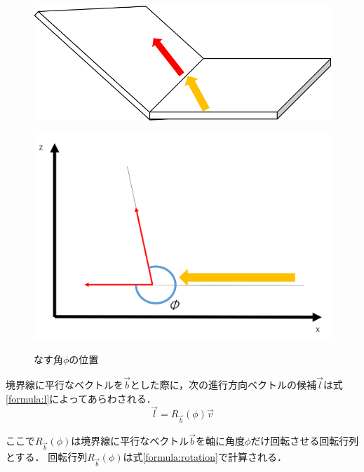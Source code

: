 \documentclass[a4paper,11pt]{jarticle}
\begin{document}
	\begin{figure}
		\begin{minipage}{0.5\linewidth}
			\centering
			\includegraphics[width=1\linewidth]{png/sub.png}
			\label{fig:phi}
		\end{minipage}
		\begin{minipage}{0.5\linewidth}
			\centering
			\includegraphics[width=1\linewidth]{png/rotation.png}
			\label{fig:xz}
		\end{minipage}
		\caption{なす角$\phi$の位置}
		\label{fig:rotation}
	\end{figure}
	
	境界線に平行なベクトルを$\vec{b} $とした際に，次の進行方向ベクトルの候補$\vec{l}$は式\ref{formula:l}によってあらわされる．
	\begin{equation}
	\label{formula:l}
	\vec{l} = R_{\vec{b}}(\phi)\vec{v}
	\end{equation}
	
	ここで$R_{\vec{b}}(\phi)$は境界線に平行なベクトル$\vec{b}$を軸に角度$\phi$だけ回転させる回転行列とする．
	回転行列$R_{\vec{b}}(\phi)$は式\ref{formula:rotation}で計算される．
	
\end{document}
